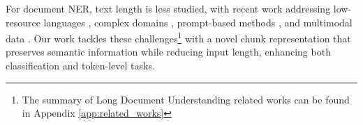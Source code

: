 \documentclass[11pt]{article}
\begin{document}
For document NER, text length is less studied, with recent work addressing low-resource languages \citep{ccetindaug2023named, mengliev2024developing}, complex domains \citep{park2023web, bhattacharya2023improving}, prompt-based methods \citep{wang2023gpt, dagdelen2024structured, hu2024improving}, and multimodal data \citep{yu2023grounded, zhang2023reducing, li-etal-2025-midas}. Our work tackles these challenges\footnote{The summary of Long Document Understanding related works can be found in Appendix \ref{app:related_works}} with a novel chunk representation that preserves semantic information while reducing input length, enhancing both classification and token-level tasks.
\end{document}
